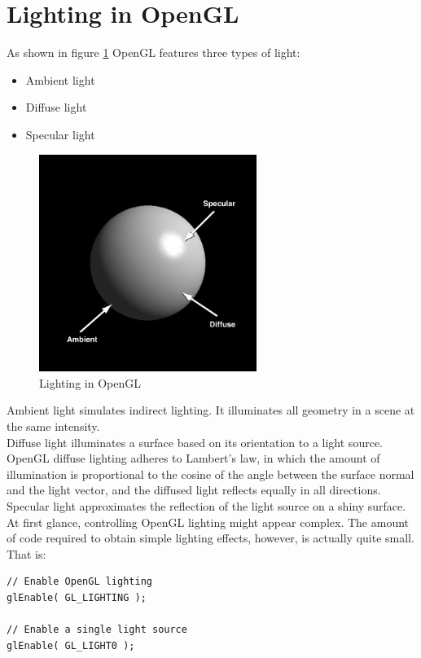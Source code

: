 \section{Lighting in OpenGL}
\label{opengl:light}
\lstset{language=C++}

As shown in figure \ref{fig:lighting} OpenGL features three types of light:

\begin{itemize}
  \item Ambient light
  \item Diffuse light
  \item Specular light
\end{itemize}

\begin{figure}[!h]
  \begin{center}
    \includegraphics[width=200pt]{img/light}
    \caption{Lighting in OpenGL}
    \label{fig:lighting}
  \end{center}
\end{figure}

Ambient light simulates indirect lighting. It illuminates all 
geometry in a scene at the same intensity.
\\
Diffuse light illuminates a surface based on its orientation 
to a light source. OpenGL diffuse lighting adheres to 
Lambert's law, in which the amount of illumination is proportional 
to the cosine of the angle between the surface normal and the 
light vector, and the diffused light reflects equally in 
all directions.
\\
Specular light approximates the reflection of the light source on 
a shiny surface.
\\
At first glance, controlling OpenGL lighting might appear complex. 
The amount of code required to obtain simple lighting effects, 
however, is actually quite small. That is:
\\
\begin{lstlisting}[caption={Lighting example}, label={code:lighting}]
// Enable OpenGL lighting
glEnable( GL_LIGHTING );

// Enable a single light source
glEnable( GL_LIGHT0 );
\end{lstlisting}

